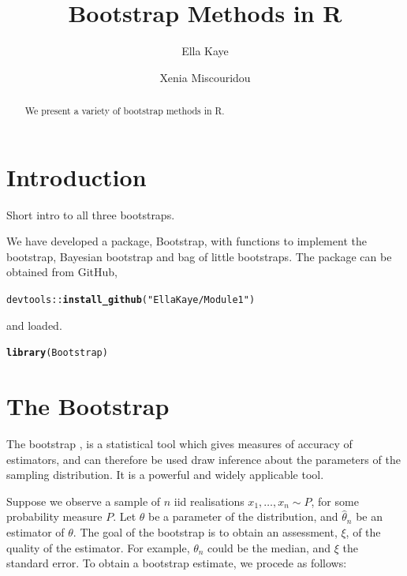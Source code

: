 \documentclass{article}\usepackage[]{graphicx}\usepackage[]{color}
\title{Bootstrap Methods in R}
\author{Ella Kaye \and Xenia Miscouridou}
\makeatletter
\newcommand{\hlstr}[1]{\textcolor[rgb]{0.192,0.494,0.8}{#1}}%
\newcommand{\hlopt}[1]{\textcolor[rgb]{0,0,0}{#1}}%
\newcommand{\hlstd}[1]{\textcolor[rgb]{0.345,0.345,0.345}{#1}}%
\newcommand{\hlkwd}[1]{\textcolor[rgb]{0.737,0.353,0.396}{\textbf{#1}}}%
\newenvironment{kframe}{%
 \def\at@end@of@kframe{}%
 \ifinner\ifhmode%
  \def\at@end@of@kframe{\end{minipage}}%
  \begin{minipage}{\columnwidth}%
 \fi\fi%
 \def\FrameCommand##1{\hskip\@totalleftmargin \hskip-\fboxsep
 \colorbox{shadecolor}{##1}\hskip-\fboxsep
     \hskip-\linewidth \hskip-\@totalleftmargin \hskip\columnwidth}%
 \MakeFramed {\advance\hsize-\width
   \@totalleftmargin\z@ \linewidth\hsize
   \@setminipage}}%
 {\par\unskip\endMakeFramed%
 \at@end@of@kframe}
\newenvironment{knitrout}{}{} %
\makeatother
\begin{document}
\maketitle

\begin{abstract}
We present a variety of bootstrap methods in R.
\end{abstract}

\section{Introduction}
Short intro to all three bootstraps.

We have developed a package, Bootstrap, with functions to implement the bootstrap, Bayesian bootstrap and bag of little bootstraps. The package can be obtained from GitHub,
\begin{knitrout}
\color{fgcolor}\begin{kframe}
\begin{alltt}
\hlstd{devtools}\hlopt{::}\hlkwd{install_github}\hlstd{(}\hlstr{"EllaKaye/Module1"}\hlstd{)}
\end{alltt}
\end{kframe}
\end{knitrout}
and loaded.
\begin{knitrout}
\color{fgcolor}\begin{kframe}
\begin{alltt}
\hlkwd{library}\hlstd{(Bootstrap)}
\end{alltt}
\end{kframe}
\end{knitrout}



\section{The Bootstrap}
The bootstrap \parencite{Efron1979}, is a statistical tool which gives measures of accuracy of estimators, and can therefore be used draw inference about the parameters of the sampling distribution. It is a powerful and widely applicable tool.

Suppose we observe a sample of $n$ iid realisations  $x_1,\ldots, x_n \sim P$, for some probability measure $P$. Let $\theta$ be a parameter of the distribution, and $\hat\theta_n$ be an estimator of $\theta$. The goal of the bootstrap is to obtain an assessment, $\xi$, of the quality of the estimator. For example, $\theta_n$ could be the median, and $\xi$ the standard error. To obtain a bootstrap estimate, we procede as follows:
\end{document}

